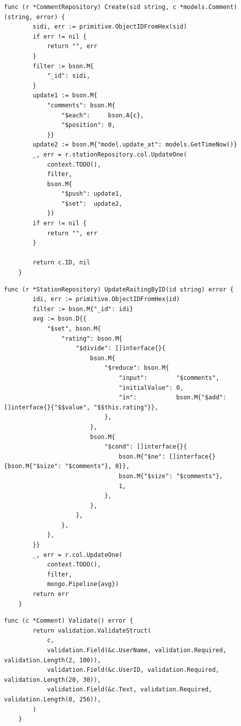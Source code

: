 \begin{lstlisting}[label=list:repo_comment_create,caption=Serwis tworzenia komentarza,basicstyle=\tiny\ttfamily]
    func (r *CommentRepository) Create(sid string, c *models.Comment) (string, error) {
        sidi, err := primitive.ObjectIDFromHex(sid)
        if err != nil {
            return "", err
        }
        filter := bson.M{
            "_id": sidi,
        }
        update1 := bson.M{
            "comments": bson.M{
                "$each":     bson.A{c},
                "$position": 0,
            }}
        update2 := bson.M{"model.update_at": models.GetTimeNow()}
        _, err = r.stationRepository.col.UpdateOne(
            context.TODO(),
            filter,
            bson.M{
                "$push": update1,
                "$set":  update2,
            })
        if err != nil {
            return "", err
        }
    
        return c.ID, nil
    }
\end{lstlisting}
\begin{lstlisting}[label=list:update_rating,caption=Aktualizacja oceny stacji,basicstyle=\tiny\ttfamily]
    func (r *StationRepository) UpdateRaitingByID(id string) error {
        idi, err := primitive.ObjectIDFromHex(id)
        filter := bson.M{"_id": idi}
        avg := bson.D{{
            "$set", bson.M{
                "rating": bson.M{
                    "$divide": []interface{}{
                        bson.M{
                            "$reduce": bson.M{
                                "input":        "$comments",
                                "initialValue": 0,
                                "in":           bson.M{"$add": []interface{}{"$$value", "$$this.rating"}},
                            },
                        },
                        bson.M{
                            "$cond": []interface{}{
                                bson.M{"$ne": []interface{}{bson.M{"$size": "$comments"}, 0}},
                                bson.M{"$size": "$comments"},
                                1,
                            },
                        },
                    },
                },
            },
        }}
        _, err = r.col.UpdateOne(
            context.TODO(),
            filter,
            mongo.Pipeline{avg})
        return err
    }
\end{lstlisting}
\begin{lstlisting}[label=list:validate_comment,caption=Tworzenie komentarza w bazie danych,basicstyle=\tiny\ttfamily]
    func (c *Comment) Validate() error {
        return validation.ValidateStruct(
            c,
            validation.Field(&c.UserName, validation.Required, validation.Length(2, 100)),
            validation.Field(&c.UserID, validation.Required, validation.Length(20, 30)),
            validation.Field(&c.Text, validation.Required, validation.Length(8, 256)),
        )
    }
\end{lstlisting}


